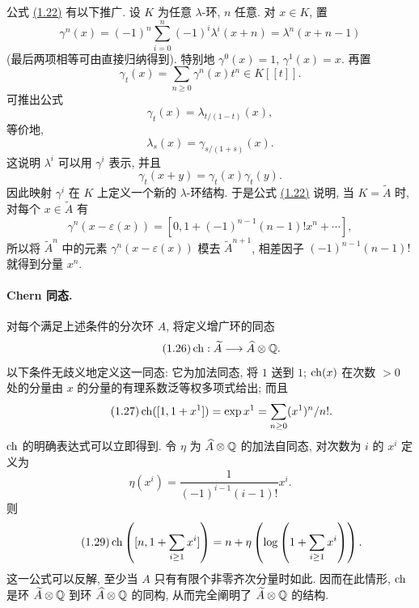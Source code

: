 公式 \hyperlink{sga6.e00.eq.1-22}{(1.22)} 有以下推广. 设 $K$ 为任意 $\lambda$-环, $n$ 任意. 对 $x\in K$, 置
\begin{equation}\tag{1.23}
\gamma^n(x)=(-1)^n\sum_{i=0}^{n}(-1)^i\lambda^i(x+n)=\lambda^n(x+n-1)
\end{equation}
(最后两项相等可由直接归纳得到). 特别地 $\gamma^0(x)=1$, $\gamma^1(x)=x$. 再置
\begin{equation}\tag{1.24}
\gamma_t(x)=\sum_{n\geq 0}\gamma^n(x)t^n\in K[[t]].
\end{equation}
可推出公式
\begin{equation}\tag{1.25}
\gamma_t(x)=\lambda_{t/(1-t)}(x),
\end{equation}
等价地,
\begin{equation}\tag{1.25 bis}
\lambda_s(x)=\gamma_{s/(1+s)}(x).
\end{equation}
这说明 $\lambda^i$ 可以用 $\gamma^i$ 表示, 并且
\[
\gamma_t(x+y)=\gamma_t(x)\gamma_t(y).
\]
因此映射 $\gamma^i$ 在 $K$ 上定义一个新的 $\lambda$-环结构. 于是公式 \hyperlink{sga6.e00.eq.1-22}{(1.22)} 说明, 当 $K=\widetilde A$ 时, 对每个 $x\in\widetilde A$ 有
\begin{equation}\tag{1.22 bis}
\gamma^n(x-\varepsilon(x))=[0,1+(-1)^{n-1}(n-1)!x^n+\cdots],
\end{equation}
所以将 $\widetilde A^n$ 中的元素 $\gamma^n(x-\varepsilon(x))$ 模去 $\widetilde A^{n+1}$, 相差因子 $(-1)^{n-1}(n-1)!$ 就得到分量 $x^n$.

\paragraph{Chern 同态.}
对每个满足上述条件的分次环 $A$, 将定义增广环的同态
\begin{equation}\tag{1.26}
\operatorname{ch}:\widetilde A\longrightarrow \widehat A\otimes\mathbb Q.
\end{equation}
以下条件无歧义地定义这一同态: 它为加法同态, 将 $1$ 送到 $1$; $\operatorname{ch}(x)$ 在次数 $>0$ 处的分量由 $x$ 的分量的有理系数泛等权多项式给出; 而且
\begin{equation}\tag{1.27}
\operatorname{ch}([1,1+x^1])=\exp x^1=\sum_{n\geq 0}(x^1)^n/n!.
\end{equation}
$\operatorname{ch}$ 的明确表达式可以立即得到. 令 $\eta$ 为 $\widehat A\otimes\mathbb Q$ 的加法自同态, 对次数为 $i$ 的 $x^i$ 定义为
\begin{equation}\tag{1.28}
\eta(x^i)=\frac{1}{(-1)^{i-1}(i-1)!}x^i .
\end{equation}
则
\begin{equation}\tag{1.29}
\operatorname{ch}\left([n,1+\sum_{i\geq 1}x^i]\right)
=n+\eta\left(\log\left(1+\sum_{i\geq 1}x^i\right)\right).
\end{equation}
这一公式可以反解, 至少当 $A$ 只有有限个非零齐次分量时如此. 因而在此情形, $\operatorname{ch}$ 是环 $\widetilde A\otimes\mathbb Q$ 到环 $\widehat A\otimes\mathbb Q$ 的同构, 从而完全阐明了 $\widetilde A\otimes\mathbb Q$ 的结构.

